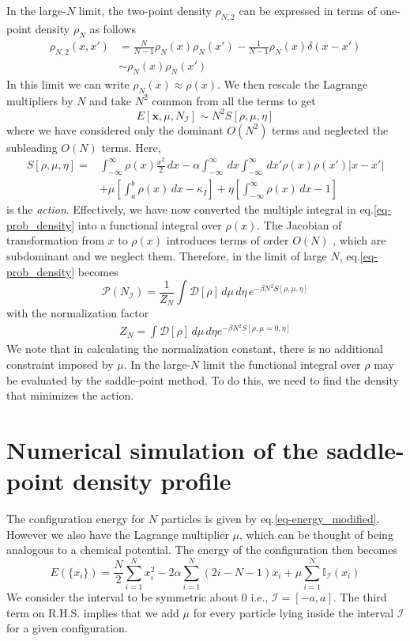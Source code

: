 \documentclass[11pt]{article}
\begin{document}
In the large-$N$ limit, the two-point density $\rho_{N,2}$ can be expressed in terms of one-point density $\rho_N$ as follows
\begin{align*}
\rho_{N,2}(x,x')&=\frac{N}{N-1}\rho_N(x)\rho_N(x')-\frac{1}{N-1}\rho_N(x)\delta(x-x')\\
&\sim \rho_N(x)\rho_N(x')
\end{align*} 
In this limit we can write $\rho_N(x) \approx \rho(x)$. We then rescale the Lagrange multipliers by $N$ and take $N^2$ common from all the terms to get
\begin{equation}
E[\textbf{x},\mu,N_\mathcal{I}]\sim N^2 S[\rho,\mu,\eta]
\end{equation}
where we have considered only the dominant $O(N^2)$ terms and neglected the subleading $O(N)$ terms. Here,
\begin{align}
S[\rho,\mu,\eta]=&\int_{-\infty}^\infty\rho (x)\frac{x^2}{2}\,dx-\alpha\int_{-\infty}^\infty\,dx\int_{-\infty}^\infty \, dx'\rho (x)\rho (x')|x-x'|\nonumber\\
&+\mu\left[\int_{a}^{b}\rho(x)\,dx-\kappa_I\right]+\eta\left[\int_{-\infty}^\infty\rho (x) \, dx-1\right]\label{eq-action}
\end{align}
is the \textit{action}. Effectively, we have now converted the multiple integral in eq.\eqref{eq-prob_density} into a functional integral over $\rho(x)$. The Jacobian of transformation from $x$ to $\rho(x)$ introduces terms of order $O(N)$ \cite{ref:forrester}, which are subdominant and we neglect them. Therefore, in the limit of large $N$, eq.\eqref{eq-prob_density} becomes
\begin{equation}
\mathcal{P}(N_\mathcal{I})=\frac{1}{Z_N}\int\mathcal{D}[\rho]\, d\mu\, d\eta\, e^{-\beta N^2 S[\rho,\mu,\eta]} 
\end{equation}
with the normalization factor 
\begin{align*}
Z_N = \int\mathcal{D}[\rho]\, d\mu \, d\eta e^{-\beta N^2S[\rho,\mu=0,\eta]}
\end{align*}
We note that in calculating the normalization constant, there is no additional constraint imposed by $\mu$. In the large-$N$ limit the functional integral over $\rho$ may be evaluated by the saddle-point method. To do this, we need to find the density that minimizes the action.


\section{Numerical simulation of the saddle-point density profile}
The configuration energy for $N$ particles is given by eq.\eqref{eq-energy_modified}. However we also have the Lagrange multiplier $\mu$, which can be thought of being analogous to a chemical potential. The energy of the configuration then becomes
\begin{equation}
E(\{x_i\})=\frac{N}{2}\sum_{i=1}^Nx_i^2-2 \alpha \sum_{i=1}^N(2i-N-1)x_i+\mu\sum_{i=1}^N \mathbb{I}_\mathcal{I}(x_i)\label{eq-energy_simulation}
\end{equation}
We consider the interval to be symmetric about 0 i.e., $\mathcal{I}=[-a,a]$. The third term on R.H.S. implies that we add $\mu$ for every particle lying inside the interval $\mathcal{I}$ for a given configuration.
\end{document}

